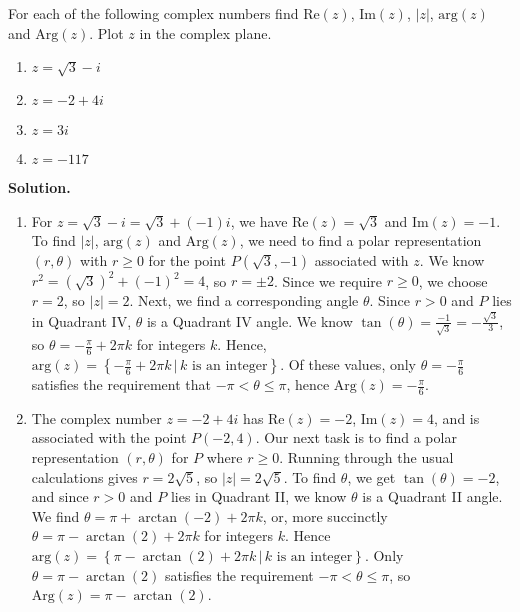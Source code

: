 \begin{ex} \label{plotmodargex}  For each of the following complex numbers find $\text{Re}(z)$, $\text{Im}(z)$, $|z|$, $\text{arg}(z)$ and $\text{Arg}(z)$.  Plot $z$ in the complex plane.

\begin{multicols}{4}

\begin{enumerate}

\item  $z = \sqrt{3}-i$

\item  $z = -2+4i$

\item  $z = 3i$

\item  $z = -117$

\end{enumerate}

\end{multicols}

{\bf Solution.} 

\begin{enumerate}

\item For $z = \sqrt{3} -i = \sqrt{3} + (-1)i$, we have $\text{Re}(z) = \sqrt{3}$ and $\text{Im}(z) = -1$.   To find $|z|$, $\text{arg}(z)$ and $\text{Arg}(z)$, we need to find a polar representation $(r,\theta)$ with $r \geq 0$ for the point $P(\sqrt{3},-1)$ associated with $z$.   We know $r^2 = (\sqrt{3})^2 + (-1)^2 = 4$, so $r = \pm 2$.  Since we require $r \geq 0$, we choose $r =2$, so $|z| = 2$.  Next, we find a corresponding angle $\theta$.  Since $r>0$ and $P$ lies in Quadrant IV, $\theta$ is a Quadrant IV angle.  We know $\tan(\theta) = \frac{-1}{\sqrt{3}} = -\frac{\sqrt{3}}{3}$, so $\theta = -\frac{\pi}{6} + 2\pi k$ for integers $k$.  Hence, $\text{arg}(z) = \left\{-\frac{\pi}{6} + 2\pi k \, | \, \text{$k$ is an integer} \right\}$. Of these values, only  $\theta = -\frac{\pi}{6}$  satisfies the requirement that $-\pi < \theta \leq \pi$, hence $\text{Arg}(z) = -\frac{\pi}{6}$.  

\item The complex number $z = -2+4i$ has  $\text{Re}(z) = -2$,   $\text{Im}(z) = 4$, and is associated with the point $P(-2,4)$.  Our next task is to find a polar representation $(r,\theta)$ for $P$ where $r \geq 0$. Running through the usual calculations gives $r = 2\sqrt{5}$, so $|z| = 2\sqrt{5}$.  To find $\theta$, we get $\tan(\theta) = -2$, and since $r > 0$ and $P$ lies in Quadrant II, we know $\theta$  is a Quadrant II angle.  We find $\theta = \pi + \arctan(-2) + 2\pi k$, or, more succinctly  $\theta = \pi - \arctan(2) + 2\pi k$ for integers $k$.  Hence $\text{arg}(z) = \left\{\pi - \arctan(2) + 2\pi k \, | \, \text{$k$ is an integer}\right\}$.  Only  $\theta = \pi - \arctan(2)$ satisfies the requirement $-\pi < \theta \leq \pi$,  so $\text{Arg}(z) = \pi - \arctan(2)$. 


\end{enumerate}
\end{ex}
